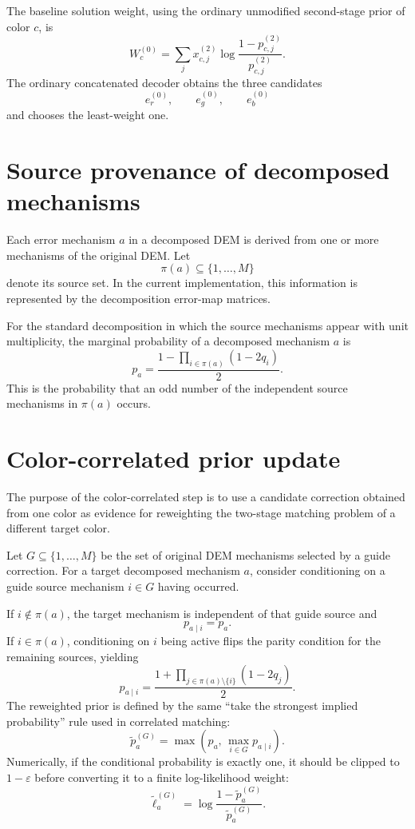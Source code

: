 \documentclass[11pt]{article}
\begin{document}
The baseline solution weight, using the ordinary unmodified second-stage prior of
color $c$, is
\[
    W_c^{(0)}
    =
    \sum_j x_{c,j}^{(2)}
    \log\frac{1-p_{c,j}^{(2)}}{p_{c,j}^{(2)}}.
\]
The ordinary concatenated decoder obtains the three candidates
\[
    e_r^{(0)},\qquad e_g^{(0)},\qquad e_b^{(0)}
\]
and chooses the least-weight one.

\section{Source provenance of decomposed mechanisms}

Each error mechanism $a$ in a decomposed DEM is derived from one or more mechanisms
of the original DEM.  Let
\[
    \pi(a)\subseteq\{1,\ldots,M\}
\]
denote its source set.  In the current implementation, this information is represented
by the decomposition error-map matrices.

For the standard decomposition in which the source mechanisms appear with unit
multiplicity, the marginal probability of a decomposed mechanism $a$ is
\[
    p_a
    =
    \frac{
        1-\prod_{i\in\pi(a)}(1-2q_i)
    }{2}.
\]
This is the probability that an odd number of the independent source mechanisms in
$\pi(a)$ occurs.

\section{Color-correlated prior update}

The purpose of the color-correlated step is to use a candidate correction obtained
from one color as evidence for reweighting the two-stage matching problem of a
different target color.

Let $G\subseteq\{1,\ldots,M\}$ be the set of original DEM mechanisms selected by a
guide correction.  For a target decomposed mechanism $a$, consider conditioning on a
guide source mechanism $i\in G$ having occurred.

If $i\notin\pi(a)$, the target mechanism is independent of that guide source and
\[
    p_{a\mid i}=p_a.
\]
If $i\in\pi(a)$, conditioning on $i$ being active flips the parity condition for the
remaining sources, yielding
\[
    p_{a\mid i}
    =
    \frac{
        1+\displaystyle\prod_{j\in\pi(a)\setminus\{i\}}(1-2q_j)
    }{2}.
\]
The reweighted prior is defined by the same ``take the strongest implied
probability'' rule used in correlated matching:
\[
    \widetilde p_a^{(G)}
    =
    \max\left(
        p_a,\,
        \max_{i\in G}p_{a\mid i}
    \right).
\]
Numerically, if the conditional probability is exactly one, it should be clipped to
$1-\varepsilon$ before converting it to a finite log-likelihood weight:
\[
    \widetilde\ell_a^{(G)}
    =
    \log\frac{1-\widetilde p_a^{(G)}}{\widetilde p_a^{(G)}}.
\]
\end{document}
